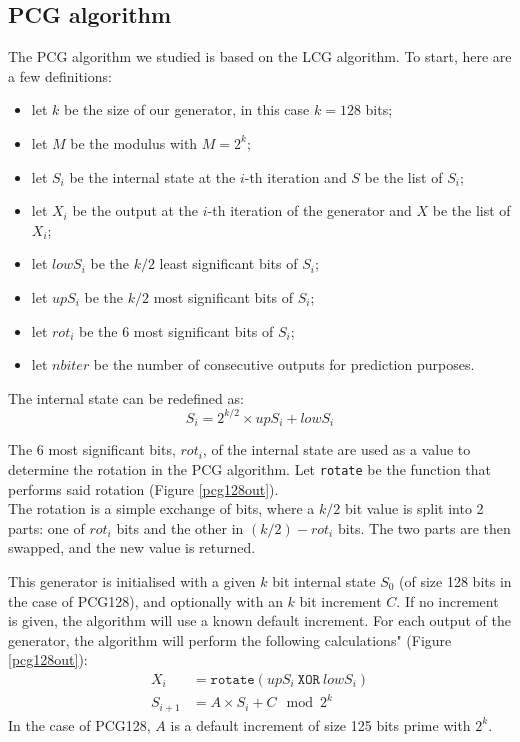 \documentclass[preprint]{iacrtrans}
\begin{document}
\subsection{PCG algorithm}

The PCG algorithm we studied is based on the LCG algorithm. To start, here are a few definitions:
\begin{itemize}
    \item let $k$ be the size of our generator, in this case $k = 128$ bits;
    \item let $M$ be the modulus with $M = 2^k$;
    \item let $S_i$ be the internal state at the $i$-th iteration and $S$ be the list of $S_i$;
    \item let $X_i$ be the output at the $i$-th iteration of the generator and $X$ be the list of $X_i$;
    \item let $lowS_i$ be the $k/2$ least significant bits of $S_i$;
    \item let $upS_i$ be the $k/2$ most significant bits of $S_i$;
    \item let $rot_i$ be the 6 most significant bits of $S_i$;
    \item let $nbiter$ be the number of consecutive outputs for prediction purposes.
\end{itemize}

The internal state can be redefined as:
\begin{equation}
    S_i = 2^{k/2} \times upS_i + lowS_i 
\end{equation}

The 6 most significant bits, $rot_i$, of the internal state are used as a value to determine the rotation in the PCG algorithm. Let \texttt{rotate} be the function that performs said rotation (Figure \ref{pcg128out}).\\
The rotation is a simple exchange of bits, where a $k/2$ bit value is split into 2 parts: one of $rot_i$ bits and the other in $(k/2) - rot_i$ bits. The two parts are then swapped, and the new value is returned. 

This generator is initialised with a given $k$ bit internal state $S_0$ (of size 128 bits in the case of PCG128), and optionally with an $k$ bit increment $C$. If no increment is given, the algorithm will use a known default increment. For each output of the generator, the algorithm will perform the following calculations" (Figure \ref{pcg128out}):\\
\begin{align}
    X_{i} &= \mathtt{rotate}(upS_i\ \mathtt{XOR}\ lowS_i)\\
    S_{i+1} &= A \times S_{i} + C \mod{2^k}
\end{align}
In the case of PCG128, $A$ is a default increment of size 125 bits prime with $2^k$.
\end{document}
